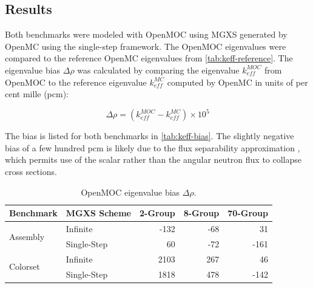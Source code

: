 \subsection{Results}
\label{subsec:results}

Both benchmarks were modeled with OpenMOC using MGXS generated by OpenMC using the single-step framework. The OpenMOC eigenvalues were compared to the reference OpenMC eigenvalues from \autoref{tab:keff-reference}. The eigenvalue bias $\Delta\rho$ was calculated by comparing the eigenvalue $k_{eff}^{MOC}$ from OpenMOC to the reference eigenvalue $k_{eff}^{MC}$ computed by OpenMC in units of per cent mille (pcm):

\begin{equation}
\label{eqn:delta-rho}
\Delta\rho = \left(k_{eff}^{MOC} - k_{eff}^{MC}\right) \times 10^{5}
\end{equation}

The bias is listed for both benchmarks in \autoref{tab:keff-bias}. The slightly negative bias of a few hundred pcm is likely due to the flux separability approximation \cite{boyd2017sph}, which permits use of the scalar rather than the angular neutron flux to collapse cross sections. 



\begin{table}[h!]
  \centering
  \caption{OpenMOC eigenvalue bias $\Delta\rho$.}
  \label{tab:keff-bias} 
  \begin{tabular}{l l r r r}
  \toprule
  \textbf{Benchmark} & \textbf{MGXS Scheme} & \textbf{2-Group} & \textbf{8-Group} & \textbf{70-Group} \\
  \midrule
  \multirow{2}{*}{Assembly} & Infinite    & -132 & -68 &   31 \\
                            & Single-Step &   60 & -72 & -161 \\
  \midrule
  \multirow{2}{*}{Colorset} & Infinite    & 2103 & 267 &   46 \\
                            & Single-Step & 1818 & 478 & -142 \\
  \bottomrule
\end{tabular}
\end{table}


